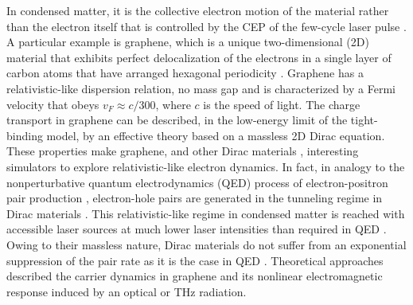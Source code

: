 \documentclass[9pt,twocolumn,twoside]{osajnl}
\begin{document}
In condensed matter, %
it is the collective electron motion of the material rather than the electron itself that is controlled by the CEP of the few-cycle laser pulse \cite{Zherebstov_NatPhys7_656}. 
A particular example is graphene, which is a unique two-dimensional (2D) material that exhibits perfect delocalization of the electrons in a single layer of carbon atoms that have arranged hexagonal periodicity \cite{Geim_NatureMat6_183,RevModPhys.81.109}.  Graphene has a relativistic-like dispersion relation, no mass gap and is characterized by a Fermi velocity that obeys $v_F \approx c/300$, where $c$ is the speed of light.
 The charge transport in graphene can be described, in the low-energy limit of the tight-binding model, by an effective theory based on a massless 2D Dirac equation. These properties make graphene, and other Dirac materials \cite{doi:10.1080/00018732.2014.927109}, interesting simulators to explore  relativistic-like electron dynamics. 
 In fact, in analogy to the nonperturbative quantum electrodynamics (QED) process of electron-positron pair production  \cite{PhysRev.82.664}, electron-hole pairs are generated in the tunneling regime in Dirac materials \cite{PhysRevD.78.096009}. This relativistic-like regime in condensed matter is reached with accessible laser sources at much lower laser intensities than required in QED  \cite{RevModPhys.84.1177}. Owing to their massless nature,   Dirac materials do not suffer from an exponential suppression of the pair rate as it is the case in QED \cite{PhysRevB.94.125423}.
Theoretical approaches described the carrier dynamics in graphene and its nonlinear electromagnetic response induced by an optical \cite{PhysRevB.84.205406,Jafari_JPCondMatt24,PhysRevB.95.035405} or THz \cite{Mikhailov_EPL79_27002,PhysRevB.90.245423,PhysRevB.93.085403} radiation. 
\end{document}
